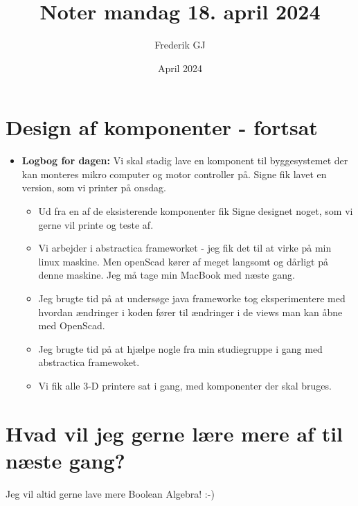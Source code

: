 \documentclass{article}
\title{Noter mandag 18. april 2024}
\author{Frederik GJ}
\date{April 2024}
\begin{document}
\maketitle

\section{Design af komponenter - fortsat}

\begin{itemize}
    \item \textbf{Logbog for dagen:} Vi skal stadig lave en komponent til byggesystemet der kan monteres mikro computer og motor controller på. Signe fik lavet en version, som vi printer på onsdag.
    \begin{itemize}
        \item Ud fra en af de eksisterende komponenter fik Signe designet noget, som vi gerne vil printe og teste af. 
        \item Vi arbejder i abstractica frameworket - jeg fik det til at virke på min linux maskine. Men openScad kører af meget langsomt og dårligt på denne maskine. Jeg må tage min MacBook med næste gang. 
        \item Jeg brugte tid på at undersøge java frameworke tog eksperimentere med hvordan ændringer i koden fører til ændringer i de views man kan åbne med OpenScad.
        \item Jeg brugte tid på at hjælpe nogle fra min studiegruppe i gang med abstractica framewoket. 
        \item Vi fik alle 3-D printere sat i gang, med komponenter der skal bruges.  
    \end{itemize}
\end{itemize}

\section{Hvad vil jeg gerne lære mere af til næste gang?}
Jeg vil altid gerne lave mere Boolean Algebra! :-)
\end{document}
